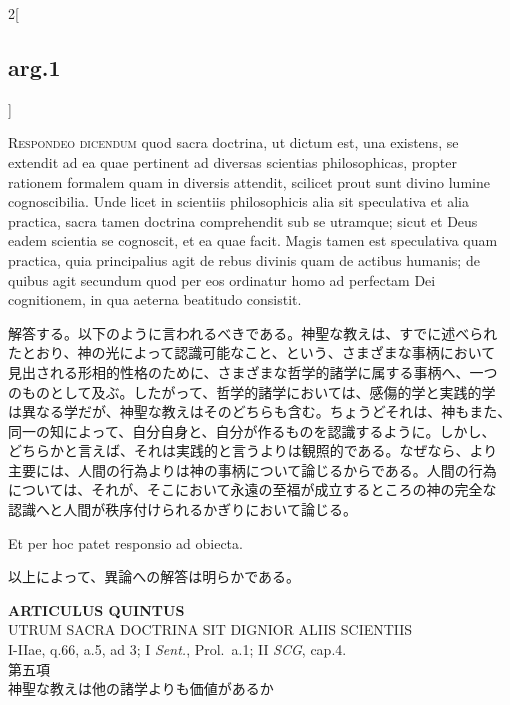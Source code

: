 \documentclass[
paper=a4paper,
fontsize=10pt,
jafontsize=9pt,
titlepage
]{jlreq}
\begin{document}
\begin{paracol}{2}[\subsection{arg.1}]

{\scshape Respondeo dicendum} quod sacra doctrina, ut dictum est, una
existens, se extendit ad ea quae pertinent ad diversas scientias
philosophicas, propter rationem formalem quam in diversis attendit,
scilicet prout sunt divino lumine cognoscibilia. Unde licet in
scientiis philosophicis alia sit speculativa et alia practica, sacra
tamen doctrina comprehendit sub se utramque; sicut et Deus eadem
scientia se cognoscit, et ea quae facit. Magis tamen est speculativa
quam practica, quia principalius agit de rebus divinis quam de actibus
humanis; de quibus agit secundum quod per eos ordinatur homo ad
perfectam Dei cognitionem, in qua aeterna beatitudo consistit.

\switchcolumn

解答する。以下のように言われるべきである。神聖な教えは、すでに述べられ
たとおり、神の光によって認識可能なこと、という、さまざまな事柄において
見出される形相的性格のために、さまざまな哲学的諸学に属する事柄へ、一つ
のものとして及ぶ。したがって、哲学的諸学においては、感傷的学と実践的学
は異なる学だが、神聖な教えはそのどちらも含む。ちょうどそれは、神もまた、
同一の知によって、自分自身と、自分が作るものを認識するように。しかし、
どちらかと言えば、それは実践的と言うよりは観照的である。なぜなら、より
主要には、人間の行為よりは神の事柄について論じるからである。人間の行為
については、それが、そこにおいて永遠の至福が成立するところの神の完全な
認識へと人間が秩序付けられるかぎりにおいて論じる。

\switchcolumn*

Et per hoc patet responsio ad obiecta.

\switchcolumn

以上によって、異論への解答は明らかである。

\end{paracol}
\newpage


{}
\setcounter{section}{5}
\setcounter{subsection}{0}
\begin{center}
 {\Large {\bfseries ARTICULUS QUINTUS}}\\
 {\large UTRUM SACRA DOCTRINA SIT DIGNIOR ALIIS SCIENTIIS}\\
 {\footnotesize I-IIae, q.66, a.5, ad 3; I {\itshape Sent.}, Prol.~a.1;
 II {\itshape SCG}, cap.4.}\\
 {\Large 第五項\\神聖な教えは他の諸学よりも価値があるか}
\end{center}
\end{document}
